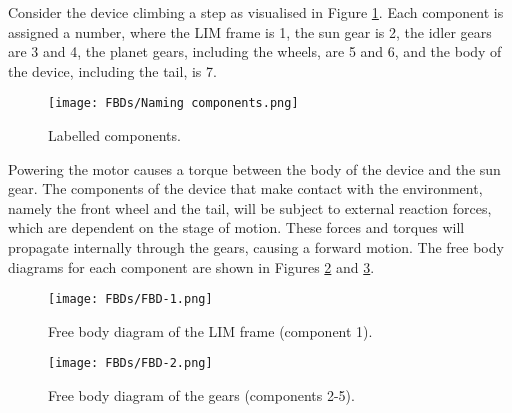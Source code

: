 Consider the device climbing a step as visualised in Figure \ref{Component-names}. Each component is assigned a number, where the LIM frame is 1, the sun gear is 2, the idler gears are 3 and 4, the planet gears, including the wheels, are 5 and 6, and the body of the device, including the tail, is 7.
\begin{figure}[h]
	\centering
	\texttt{[image: FBDs/Naming components.png]}
	\caption{Labelled components.}
	\label{Component-names}
\end{figure}
Powering the motor causes a torque between the body of the device and the sun gear. The components of the device that make contact with the environment, namely the front wheel and the tail, will be subject to external reaction forces, which are dependent on the stage of motion. These forces and torques will propagate internally through the gears, causing a forward motion. The free body diagrams for each component are shown in Figures \ref{FBD-1} and \ref{FBD-2}.\\
\begin{figure}[h]
	\centering
	\texttt{[image: FBDs/FBD-1.png]}
	\caption{Free body diagram of the LIM frame (component 1).}
	\label{FBD-1}
\end{figure}
\begin{figure}[!h]
	\centering
	\texttt{[image: FBDs/FBD-2.png]}
	\caption{Free body diagram of the gears (components 2-5).}
	\label{FBD-2}
\end{figure}


